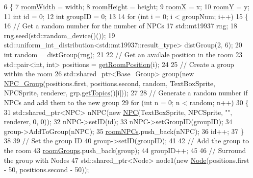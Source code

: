 \begin{DoxyCode}
6 \{
7     \hyperlink{class_room_a3538dc1a9a08a492cec337399db77259}{roomWidth} = width;
8     \hyperlink{class_room_a3f6fbe94c4c124e4c4df85e57fbb703b}{roomHeight} = height;
9     \hyperlink{class_room_a5cb7d8efa1ea04af080f7e2c041fea1a}{roomX} = x;
10     \hyperlink{class_room_a702c5d200cedc6e9eef5cbc2034fdc17}{roomY} = y;
11     \textcolor{keywordtype}{int} \textcolor{keywordtype}{id} = 0;
12     \textcolor{keywordtype}{int} groupID = 0;
13 
14     \textcolor{keywordflow}{for} (\textcolor{keywordtype}{int} i = 0; i < groupNum; i++)
15     \{
16         \textcolor{comment}{// Get a random number for the number of NPCs}
17         std::mt19937 rng;
18         rng.seed(std::random\_device()());
19         std::uniform\_int\_distribution<std::mt19937::result\_type> distGroup(2, 6);
20         \textcolor{keywordtype}{int} random = distGroup(rng);
21 
22         \textcolor{comment}{// Get an availale position in the room}
23         std::pair<int, int> positions = \hyperlink{class_room_ac57c28e2c1048649e816f731f63f9daf}{getRoomPosition}(i);
24 
25         \textcolor{comment}{// Create a group within the room}
26         std::shared\_ptr<Base\_Group> group(\textcolor{keyword}{new} \hyperlink{class_n_p_c___group}{NPC\_Group}(positions.first, positions.second, random,
       TextBoxSprite, NPCSprite, renderer, grp.\hyperlink{class_group_a160daa5f96a8203bd30340dfc1810af1}{getTopics}()[i]));
27         
28         \textcolor{comment}{// Generate a random number if NPCs and add them to the new group}
29         \textcolor{keywordflow}{for} (\textcolor{keywordtype}{int} n = 0; n < random; n++)
30         \{
31             std::shared\_ptr<NPC> nNPC(\textcolor{keyword}{new} \hyperlink{class_n_p_c}{NPC}(TextBoxSprite, NPCSprite, \textcolor{stringliteral}{""}, renderer, 0, 0));
32             nNPC->setID(\textcolor{keywordtype}{id});
33             nNPC->setGroupID(groupID);
34             group->AddToGroup(nNPC);
35             \hyperlink{class_room_a34bdf24cc8c52d638bcfd851c295f23b}{roomNPCs}.push\_back(nNPC);
36             \textcolor{keywordtype}{id}++;
37         \}
38 
39         \textcolor{comment}{// Set the group ID}
40         group->setID(groupID);
41 
42         \textcolor{comment}{// Add the group to the room}
43         \hyperlink{class_room_a2d63fa17f30d50dd5267f04170a662b0}{roomGroups}.push\_back(group);
44         groupID++;
45 
46         \textcolor{comment}{// Surround the group with Nodes}
47         std::shared\_ptr<Node> node1(\textcolor{keyword}{new} \hyperlink{class_node}{Node}(positions.first - 50, positions.second - 50));

\end{DoxyCode}
